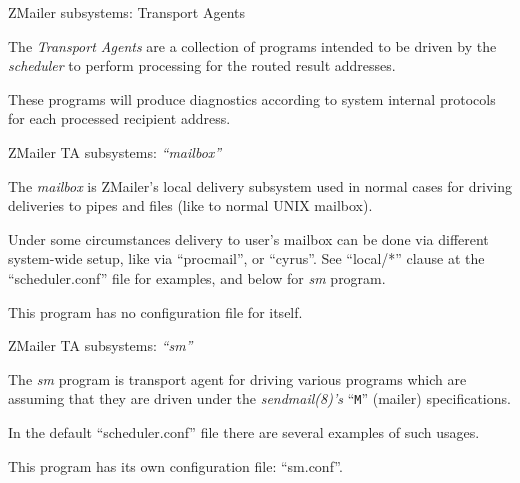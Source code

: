 \documentclass[a4paper,landscape]{slides}
\newcommand{\ZM}{ZMailer}
\begin{document}


\begin{slide}
\centerline{\large \ZM{} subsystems: Transport Agents}

The {\em Transport Agents} are a collection of programs intended
to be driven by the {\em scheduler} to perform processing for
the routed result addresses.

These programs will produce diagnostics according to system internal
protocols for each processed recipient address.

\vfill
\end{slide}


\begin{slide}
\centerline{\large \ZM{} TA subsystems: {\em ``mailbox''}}

The {\em mailbox} is \ZM's local delivery subsystem used in
normal cases for driving deliveries to pipes and files (like
to normal UNIX mailbox).

Under some circumstances delivery to user's mailbox can be
done via different system-wide setup, like via ``procmail'', or ``cyrus''.
See ``local/*'' clause at the ``scheduler.conf'' file for examples,
and below for {\em sm} program.

This program has no configuration file for itself.

\vfill
\end{slide}



\begin{slide}

\centerline{\large \ZM{} TA subsystems: {\em ``sm''}}

The {\em sm} program is transport agent for driving various
programs which are assuming that they are driven under the
{\em sendmail(8)'s} ``\verb!M!'' (mailer) specifications.

In the default ``scheduler.conf'' file there are several
examples of such usages.

This program has its own configuration file: ``sm.conf''.

\vfill
\end{slide}

\end{document}

